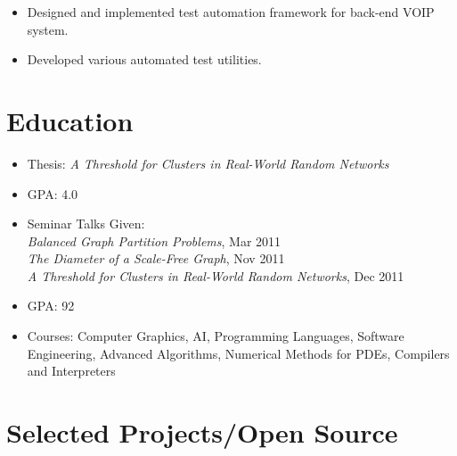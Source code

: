 \documentclass[11pt,a4paper,sans]{moderncv}
\begin{document}
{ \begin{itemize} \itemsep -1pt
  \item Designed and implemented test automation framework for back-end VOIP system.\item Developed various automated test utilities.
\end{itemize} }
  
\section{\textbf{Education}}

{ \begin{itemize} \itemsep -1pt
  \item Thesis: \textit{A Threshold for Clusters in Real-World Random Networks}\item GPA: 4.0 \item Seminar Talks Given:
          \\ \textit{Balanced Graph Partition Problems}, Mar 2011
          \\ \textit{The Diameter of a Scale-Free Graph}, Nov 2011
          \\ \textit{A Threshold for Clusters in Real-World Random Networks}, Dec 2011
\end{itemize} }
  
{ \begin{itemize} \itemsep -1pt
  \item GPA: 92\item Courses: Computer Graphics, AI, Programming Languages, Software Engineering, Advanced Algorithms, Numerical Methods for PDEs, Compilers and Interpreters 
\end{itemize} }
  

\section{\textbf{Selected Projects/Open Source}}

  
\end{document}
